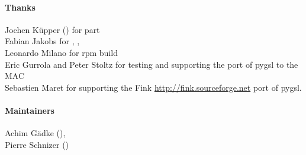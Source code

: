 \paragraph*{Thanks}
Jochen K\"upper () for 
 part\\
Fabian Jakobs for , 
, \\ 
Leonardo Milano for rpm build\\
Eric Gurrola and  Peter Stoltz for testing and supporting the port of pygsl to
the MAC\\
Sebastien Maret for supporting the Fink \url{http://fink.sourceforge.net}
port of pygsl.


\paragraph*{Maintainers}
Achim G\"adke (),\\
Pierre Schnizer ()
